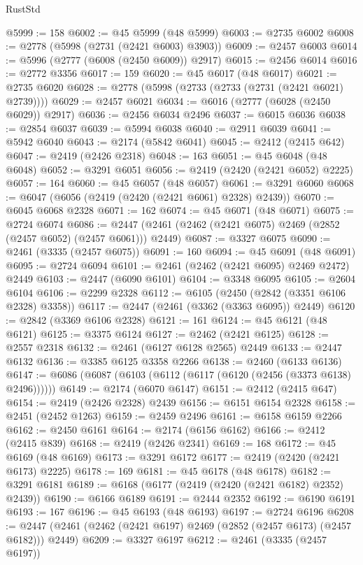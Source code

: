 \begin{lexlean}{RustStd}
\begin{coremodule}
@5999 := 158
@6002 := @45 @5999 (@48 @5999)
@6003 := @2735 @6002
@6008 := @2778 (@5998 (@2731 (@2421 @6003) @3903))
@6009 := @2457 @6003
@6014 := @5996 (@2777 (@6008 (@2450 @6009)) @2917)
@6015 := @2456 @6014
@6016 := @2772 @3356
@6017 := 159
@6020 := @45 @6017 (@48 @6017)
@6021 := @2735 @6020
@6028 := @2778 (@5998 (@2733 (@2733 (@2731 (@2421 @6021) @2739))))
@6029 := @2457 @6021
@6034 := @6016 (@2777 (@6028 (@2450 @6029)) @2917)
@6036 := @2456 @6034 @2496
@6037 := @6015 @6036
@6038 := @2854 @6037
@6039 := @5994 @6038
@6040 := @2911 @6039
@6041 := @5942 @6040
@6043 := @2174 (@5842 @6041)
@6045 := @2412 (@2415 @642)
@6047 := @2419 (@2426 @2318)
@6048 := 163
@6051 := @45 @6048 (@48 @6048)
@6052 := @3291 @6051
@6056 := @2419 (@2420 (@2421 @6052) @2225)
@6057 := 164
@6060 := @45 @6057 (@48 @6057)
@6061 := @3291 @6060
@6068 := @6047 (@6056 (@2419 (@2420 (@2421 @6061) @2328) @2439))
@6070 := @6045 @6068 @2328
@6071 := 162
@6074 := @45 @6071 (@48 @6071)
@6075 := @2724 @6074
@6086 := @2447 (@2461 (@2462 (@2421 @6075) @2469 (@2852 (@2457 @6052) (@2457 @6061))) @2449)
@6087 := @3327 @6075
@6090 := @2461 (@3335 (@2457 @6075))
@6091 := 160
@6094 := @45 @6091 (@48 @6091)
@6095 := @2724 @6094
@6101 := @2461 (@2462 (@2421 @6095) @2469 @2472) @2449
@6103 := @2447 (@6090 @6101)
@6104 := @3348 @6095
@6105 := @2604 @6104
@6106 := @2299 @2328
@6112 := @6105 (@2450 (@2842 (@3351 @6106 @2328) @3358))
@6117 := @2447 (@2461 (@3362 (@3363 @6095)) @2449)
@6120 := @2842 (@3369 @6106 @2328)
@6121 := 161
@6124 := @45 @6121 (@48 @6121)
@6125 := @3375 @6124
@6127 := @2462 (@2421 @6125)
@6128 := @2557 @2318
@6132 := @2461 (@6127 @6128 @2565) @2449
@6133 := @2447 @6132
@6136 := @3385 @6125 @3358 @2266
@6138 := @2460 (@6133 @6136)
@6147 := @6086 (@6087 (@6103 (@6112 (@6117 (@6120 (@2456 (@3373 @6138) @2496))))))
@6149 := @2174 (@6070 @6147)
@6151 := @2412 (@2415 @647)
@6154 := @2419 (@2426 @2328) @2439
@6156 := @6151 @6154 @2328
@6158 := @2451 (@2452 @1263)
@6159 := @2459 @2496
@6161 := @6158 @6159 @2266
@6162 := @2450 @6161
@6164 := @2174 (@6156 @6162)
@6166 := @2412 (@2415 @839)
@6168 := @2419 (@2426 @2341)
@6169 := 168
@6172 := @45 @6169 (@48 @6169)
@6173 := @3291 @6172
@6177 := @2419 (@2420 (@2421 @6173) @2225)
@6178 := 169
@6181 := @45 @6178 (@48 @6178)
@6182 := @3291 @6181
@6189 := @6168 (@6177 (@2419 (@2420 (@2421 @6182) @2352) @2439))
@6190 := @6166 @6189
@6191 := @2444 @2352
@6192 := @6190 @6191
@6193 := 167
@6196 := @45 @6193 (@48 @6193)
@6197 := @2724 @6196
@6208 := @2447 (@2461 (@2462 (@2421 @6197) @2469 (@2852 (@2457 @6173) (@2457 @6182))) @2449)
@6209 := @3327 @6197
@6212 := @2461 (@3335 (@2457 @6197))

\end{coremodule}
\end{lexlean}
